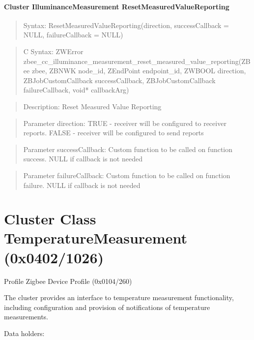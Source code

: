 \paragraph{Cluster IlluminanceMeasurement ResetMeasuredValueReporting}
\begin{quote}Syntax: ResetMeasuredValueReporting(direction, successCallback = NULL, failureCallback = NULL)\end{quote}
\begin{quote}C Syntax: ZWError zbee\_cc\_illuminance\_measurement\_reset\_measured\_value\_reporting(ZBee zbee, ZBNWK node\_id, ZEndPoint endpoint\_id, ZWBOOL direction, ZBJobCustomCallback successCallback, ZBJobCustomCallback failureCallback, void* callbackArg)\end{quote}
\begin{quote}Description: Reset Measured Value Reporting\end{quote}
\begin{quote}Parameter direction: TRUE  - receiver will be configured to receiver reports. FALSE - receiver will be configured to send reports\end{quote}
\begin{quote}Parameter successCallback: Custom function to be called on function success. NULL if callback is not needed\end{quote}
\begin{quote}Parameter failureCallback: Custom function to be called on function failure. NULL if callback is not needed\end{quote}



\section{Cluster Class TemperatureMeasurement (0x0402/1026)}

Profile Zigbee Device Profile (0x0104/260)

The cluster provides an interface to temperature measurement functionality, including configuration and provision of notifications of temperature measurements.
\newline

\noindent
Data holders:

